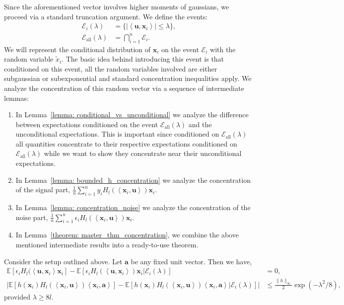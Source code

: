\documentclass[final,12pt]{colt2018} %
\newcommand{\E}{\mathbb{E}}
\renewcommand\v[1]{{\ensuremath{\boldsymbol{#1}}}}
\newcommand\ip[1]{\left\langle #1 \right\rangle}
\begin{document}
Since the aforementioned vector involves higher moments of gaussians, we proceed via a standard truncation argument.  We define the events:
\begin{align*}
    \mathcal{E}_i (\lambda) & = \{ | \ip{\v u, \v x_i} | \leq \lambda \}, \\
    \mathcal{E}_{\text{all}} (\lambda) & = \bigcap_{i=1}^n \mathcal{E}_i.
\end{align*}
We will represent the conditional distribution of $\v x_i$ on the event $\mathcal{E}_i$ with the random variable $\tilde{x}_i$. The basic idea behind introducing this event is that conditioned on this event, all the random variables involved are either subgaussian or subexponential and standard concentration inequalities apply. We analyze the concentration of this random vector via a sequence of intermediate lemmas:
\begin{enumerate}
    \item In Lemma~\ref{lemma: conditional_vs_unconditional} we analyze the difference between expectations conditioned on the event $\mathcal{E}_\text{all}(\lambda)$ and the unconditional expectations. This is important since conditioned on $\mathcal{E}_\text{all}(\lambda)$ all quantities concentrate to their respective expectations conditioned on $\mathcal{E}_\text{all}(\lambda)$ while we want to show they concentrate near their unconditional expectations. 
    \item In Lemma~\ref{lemma: bounded_h_concentration} we analyze the concentration of the signal part, $\frac{1}{n}\sum_{i=1}^n y_i H_l(\ip{\v x_i, \v u}) \v x_i$. 
    \item In Lemma~\ref{lemma: concentration_noise} we analyze the concentration of the noise part, $\frac{1}{n} \sum_{i=1}^n \epsilon_i H_l(\ip{\v x_i, \v u}) \v x_i$. 
    \item In Lemma~\ref{theorem: master_thm_concentration}, we combine the above mentioned intermediate results into a ready-to-use theorem.
\end{enumerate}
\begin{lemma} Consider the setup outlined above. Let $\v a$ be any fixed unit vector. Then we have,
\begin{align*}
    \E[ \epsilon_i H_l(\ip{\v u, \v x_i} \v x_i]  - \E[ \epsilon_i H_l(\ip{\v u, \v x_i}) \v x_i | \mathcal{E}_i(\lambda)] & = 0, \\ 
    \left| \E \left[ h(\v x_i) H_l(\ip{\v x_i, \v u}) \ip{\v x_i, \v a} \right] - \E \left[  h(\v x_i) H_l(\ip{\v x_i, \v u}) \ip{\v x_i, \v a} | \mathcal{E}_i(\lambda) \right]\right| & \leq \frac{\|h\|_\infty}{2}  \exp(-\lambda^2/8),
\end{align*}
provided $\lambda \geq 8l$.
\label{lemma: conditional_vs_unconditional}
\end{lemma}
\end{document}
